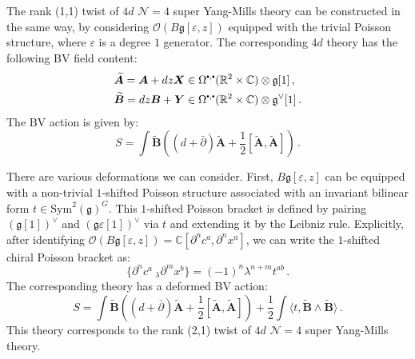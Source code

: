 \documentclass[11pt]{article}
\newcommand{\C}{\mathbb{C}}
\newcommand{\R}{\mathbb{R}}
\newcommand\sbullet[1][.5]{\mathbin{\vcenter{\hbox{\scalebox{#1}{$\bullet$}}}}}
\numberwithin{equation}{section}
\begin{document}
The rank (1,1) twist of $4d$ $\mathcal{N} = 4$ super Yang-Mills theory can be constructed in the same way, by considering $\mathcal{O}(B\mathfrak{g}[\varepsilon,z])$ equipped with the trivial Poisson structure, where $\varepsilon$ is a degree $1$ generator. The corresponding $4d$ theory has the following BV field content:
\begin{equation}
	\begin{aligned}
		&\widetilde{\boldsymbol{A}} = \boldsymbol{A} + dz \boldsymbol{X} \in \Omega^{\sbullet,\sbullet}(\R^2\times\C)\otimes \mathfrak{g}[1]\,,\\
		&\widetilde{\boldsymbol{B}}  = dz\boldsymbol{B} + \boldsymbol{Y} \in \Omega^{\sbullet,\sbullet}(\R^2\times\C)\otimes \mathfrak{g}^{\vee}[1]\,.
	\end{aligned}
\end{equation}
The BV action is given by:
\begin{equation}
	S = \int \widetilde{\boldsymbol{B}}\left( (d+\bar{\partial})\widetilde{\boldsymbol{A}} + \frac{1}{2}[\widetilde{\boldsymbol{A}},\widetilde{\boldsymbol{A}}]\right)\,.
\end{equation}

There are various deformations we can consider. First, $B\mathfrak{g}[\varepsilon,z]$ can be equipped with a non-trivial $1$-shifted Poisson structure associated with an invariant bilinear form $t \in \mathrm{Sym}^2(\mathfrak{g})^G$. This $1$-shifted Poisson bracket is defined by pairing $(\mathfrak{g}[1])^{\vee}$ and $(\mathfrak{g}\varepsilon[1])^{\vee}$ via $t$ and extending it by the Leibniz rule. Explicitly, after identifying $\mathcal{O}(B\mathfrak{g}[\varepsilon,z]) = \C[\partial^nc^a,\partial^nx^a]$, we can write the $1$-shifted chiral Poisson bracket as:
\begin{equation}\label{eq:HTBF_bra}
	\{\partial^n c^a~_\lambda \partial^mx^b\} = (-1)^n\lambda^{n+m}t^{ab}\,.
\end{equation}
The corresponding theory has a deformed BV action:
\begin{equation}
	S = \int \widetilde{\boldsymbol{B}}\left( (d+\bar{\partial})\widetilde{\boldsymbol{A}} + \frac{1}{2}[\widetilde{\boldsymbol{A}},\widetilde{\boldsymbol{A}}]\right) + \frac{1}{2}\int \langle t, \widetilde{\boldsymbol{B}}\wedge\widetilde{\boldsymbol{B}}\rangle\,.
\end{equation}
This theory corresponds to the rank (2,1) twist of $4d$ $\mathcal{N} = 4$ super Yang-Mills theory. 
\end{document}

